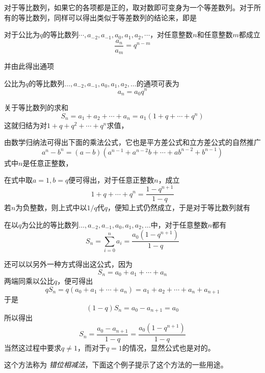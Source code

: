 对于等比数列，如果它的各项都是正的，取对数即可变身为一个等差数列。对于所有的等比数列，同样可以得出类似于等差数列的结论来，即是

\begin{theorem}
对于公比为$q$的等比数列$\cdots,a_{-2},a_{-1},a_0,a_1,a_2,\cdots$，对任意整数$n$和任意整数$m$都成立
\[ \frac{a_n}{a_m}=q^{n-m} \]
\end{theorem}

并由此得出通项
\begin{theorem}
  公比为$q$的等比数列$\ldots,a_{-2},a_{-1},a_0,a_1,a_2,\ldots$的通项可表为
 \[ a_n=a_0q^n \]
\end{theorem}

关于等比数列的求和
\[ S_n = a_1+a_2+\cdots+a_n = a_1(1+q+\cdots+q^{n}) \]
这就归结为对$1+q+q^2+\cdots+q^{n}$求值，

由数学归纳法可得出下面的乘法公式，它也是平方差公式和立方差公式的自然推广
\begin{equation}
  \label{eq:a-power-n-substract-b-power-n}
 a^n-b^n = (a-b)(a^{n-1}+a^{n-2}b+\cdots+ab^{n-2}+b^{n-1}) 
\end{equation}
式中$n$是任意正整数，

在式中取$a=1,b=q$便可得出，对于任意正整数$n$，成立
\[ 1+q+\cdots+q^{n} = \frac{1-q^{n+1}}{1-q} \]
若$n$为负整数，则上式中以$1/q$代$q$，便知上式仍然成立，于是对于等比数列就有
\begin{theorem}
  在以$q$为公比的等比数列$\ldots,a_{-2},a_{-1},a_0,a_1,a_2,\ldots$中，对于任意整数$n$都有
  \[ S_n = \sum_{i=0}^na_i = \frac{a_0(1-q^{n+1})}{1-q} \]
\end{theorem}

还可以以另外一种方式得出这公式，因为
\[ S_n = a_0+a_1+\cdots+a_n \]
两端同乘以公比$q$，便可得出
\[ qS_n = q(a_0+a_1+\cdots+a_n) = a_1+a_2+\cdots+a_n+a_{n+1} \]
于是
\[ (1-q)S_n = a_0-a_{n+1} = a_0 \]
所以得出
\[ S_n = \frac{a_0-a_{n+1}}{1-q} = \frac{a_0(1-q^{n+1})}{1-q} \]
当然这过程中要求$q \neq 1$，而对于$q=1$的情况，显然公式也是对的。

这个方法称为 \emph{错位相减法}，下面这个例子提示了这个方法的一些用途。

